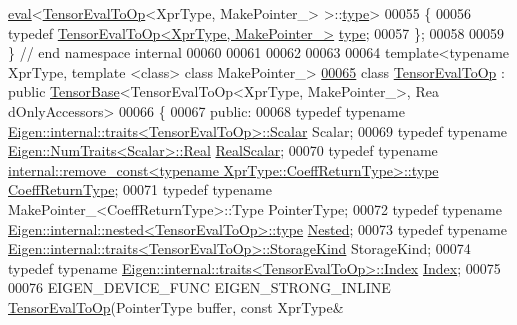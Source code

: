 \begin{DoxyCode}
      \hyperlink{struct_eigen_1_1internal_1_1eval}{eval}<\hyperlink{class_eigen_1_1_tensor_eval_to_op}{TensorEvalToOp}<XprType, MakePointer\_> >::\hyperlink{class_eigen_1_1_tensor_eval_to_op}{type}>
00055 \{
00056   \textcolor{keyword}{typedef} \hyperlink{class_eigen_1_1_tensor_eval_to_op}{TensorEvalToOp<XprType, MakePointer\_>} 
      \hyperlink{class_eigen_1_1_tensor_eval_to_op}{type};
00057 \};
00058 
00059 \}  \textcolor{comment}{// end namespace internal}
00060 
00061 
00062 
00063 
00064 \textcolor{keyword}{template}<\textcolor{keyword}{typename} XprType, \textcolor{keyword}{template} <\textcolor{keyword}{class}> \textcolor{keyword}{class }MakePointer\_>
\hyperlink{class_eigen_1_1_tensor_eval_to_op}{00065} \textcolor{keyword}{class }\hyperlink{class_eigen_1_1_tensor_eval_to_op}{TensorEvalToOp} : \textcolor{keyword}{public} \hyperlink{class_eigen_1_1_tensor_base}{TensorBase}<TensorEvalToOp<XprType, MakePointer\_>, Rea
      dOnlyAccessors>
00066 \{
00067   \textcolor{keyword}{public}:
00068   \textcolor{keyword}{typedef} \textcolor{keyword}{typename} \hyperlink{struct_eigen_1_1internal_1_1traits}{Eigen::internal::traits<TensorEvalToOp>::Scalar}
       Scalar;
00069   \textcolor{keyword}{typedef} \textcolor{keyword}{typename} \hyperlink{group___sparse_core___module}{Eigen::NumTraits<Scalar>::Real} 
      \hyperlink{group___sparse_core___module}{RealScalar};
00070   \textcolor{keyword}{typedef} \textcolor{keyword}{typename} 
      \hyperlink{group___sparse_core___module}{internal::remove\_const<typename XprType::CoeffReturnType>::type}
       \hyperlink{group___sparse_core___module}{CoeffReturnType};
00071   \textcolor{keyword}{typedef} \textcolor{keyword}{typename} MakePointer\_<CoeffReturnType>::Type PointerType;
00072   \textcolor{keyword}{typedef} \textcolor{keyword}{typename} \hyperlink{class_eigen_1_1internal_1_1_tensor_lazy_evaluator_writable}{Eigen::internal::nested<TensorEvalToOp>::type}
       \hyperlink{class_eigen_1_1internal_1_1_tensor_lazy_evaluator_writable}{Nested};
00073   \textcolor{keyword}{typedef} \textcolor{keyword}{typename} \hyperlink{struct_eigen_1_1internal_1_1traits}{Eigen::internal::traits<TensorEvalToOp>::StorageKind}
       StorageKind;
00074   \textcolor{keyword}{typedef} \textcolor{keyword}{typename} \hyperlink{struct_eigen_1_1internal_1_1traits}{Eigen::internal::traits<TensorEvalToOp>::Index}
       \hyperlink{namespace_eigen_a62e77e0933482dafde8fe197d9a2cfde}{Index};
00075 
00076   EIGEN\_DEVICE\_FUNC EIGEN\_STRONG\_INLINE \hyperlink{class_eigen_1_1_tensor_eval_to_op}{TensorEvalToOp}(PointerType buffer, \textcolor{keyword}{const} XprType& 

\end{DoxyCode}
